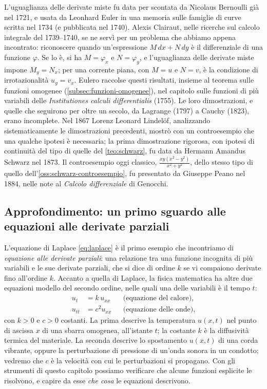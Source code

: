 \begin{notastorica}
L'uguaglianza delle derivate miste fu data per scontata da Nicolaus Bernoulli già nel
1721, e usata da Leonhard Euler in una memoria sulle famiglie di curve scritta nel 1734 (e
pubblicata nel 1740). Alexis Clairaut, nelle ricerche sul calcolo integrale del
1739--1740, se ne servì per un problema che abbiamo appena incontrato: riconoscere quando
un'espressione $M\,dx+N\,dy$ è il differenziale di una funzione $\varphi$. Se lo è, si ha
$M=\varphi_{x}$ e $N=\varphi_{y}$, e l'uguaglianza delle derivate miste impone
$M_{y}=N_{x}$; per una corrente piana, con $M=u$ e $N=v$, è la condizione di
irrotazionalità $u_{y}=v_{x}$. Eulero raccolse questi risultati, insieme al teorema sulle
funzioni omogenee (\cref{subsec:funzioni-omogenee}), nel capitolo sulle funzioni di più
variabili delle \emph{Institutiones calculi differentialis} (1755). Le loro dimostrazioni,
e quelle che seguirono per oltre un secolo, da Lagrange (1797) a Cauchy (1823), erano
incomplete. Nel 1867 Lorenz Leonard Lindelöf,
analizzando sistematicamente le dimostrazioni precedenti, mostrò con un controesempio che
una qualche ipotesi è necessaria; la prima dimostrazione rigorosa, con ipotesi di
continuità del tipo di quelle del \cref{teo:schwarz}, fu data da Hermann Amandus Schwarz
nel 1873. Il controesempio oggi classico, $\frac{xy(x^{2}-y^{2})}{x^{2}+y^{2}}$, dello stesso
tipo di quello dell'\cref{oss:schwarz-controesempio}, fu presentato da Giuseppe Peano nel
1884, nelle note al \emph{Calcolo differenziale} di Genocchi.
\end{notastorica}

\subsection{Approfondimento: un primo sguardo alle equazioni alle derivate parziali}
\label{subsec:edp-primo-sguardo}

L'equazione di Laplace \eqref{eq:laplace} è il primo esempio che incontriamo di
\emph{equazione alle derivate parziali}: una relazione tra una funzione incognita di più
variabili e le sue derivate parziali, che si dice di ordine $k$ se vi compaiono derivate
fino all'ordine $k$. Accanto a quella di Laplace, la fisica matematica ha altre due
equazioni modello del secondo ordine, nelle quali una delle variabili è il tempo $t$:
\begin{align}
  u_{t}&=k\,u_{xx} &&\text{(equazione del calore)},\label{eq:calore}\\
  u_{tt}&=c^{2}u_{xx} &&\text{(equazione delle onde)},\label{eq:onde}
\end{align}
con $k>0$ e $c>0$ costanti. La prima descrive la temperatura $u(x,t)$ nel punto di
ascissa $x$ di una sbarra omogenea, all'istante $t$; la costante $k$ è la diffusività
termica del materiale. La seconda descrive lo spostamento $u(x,t)$ di una corda vibrante,
oppure la perturbazione di pressione di un'onda sonora in un condotto; vedremo che $c$ è
la velocità con cui le perturbazioni si propagano. Con gli strumenti di questo capitolo
possiamo verificare che alcune funzioni esplicite le risolvono, e capire da esse
\emph{che cosa} le equazioni descrivono.

